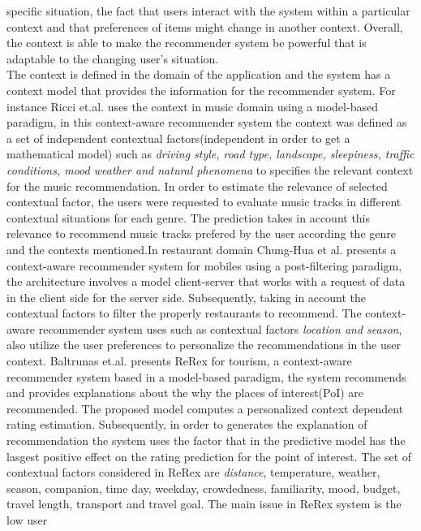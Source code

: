specific situation, the fact that users interact with the system
within a particular context and  that preferences of items might 
change in another context.  
Overall, the context is able to make the recommender system be 
powerful that is adaptable to the changing user's situation.\\
The context is defined in the domain of the application and the system
has a context model that provides the information for the recommender
system. For instance Ricci et.al. \cite{baltrunas2011incarmusic} uses
the context in music domain using a model-based paradigm, in this
context-aware recommender system the context was defined as a set of
independent contextual factors(independent in order to get a
mathematical model) such as \textit{driving style, road type,
landscape, sleepiness, traffic conditions, mood weather and natural
phenomena} to specifies the relevant context for the music
recommendation. In order to estimate the relevance of selected
contextual factor, the users were requested to evaluate music tracks
in different contextual situations for each genre. The prediction
takes in account this relevance to recommend music tracks prefered by
the user according the genre and the contexts mentioned.In
restaurant domain Chung-Hua et al.\cite{chu2013chinese} presents a
context-aware recommender system for mobiles using a post-filtering
paradigm, the architecture involves a model client-server that works
with a request of data in the client side for the server side.
Subsequently, taking in account the contextual factors to filter the
properly restaurants to recommend. The context-aware recommender
system uses such as contextual factors \textit{location and season}, 
also utilize the user preferences to personalize the recommendations
in the user context.
Baltrunas et.al.\cite{baltrunas2011context} presents ReRex for tourism, 
a context-aware recommender system based in a model-based paradigm, the system
recommends and provides explanations about the why the places of
interest(PoI) are recommended. The proposed model computes a
personalized context dependent rating estimation. Subsequently, in
order to generates the explanation of recommendation the system uses
the factor that in the predictive model has the lasgest positive
effect on the rating prediction for the point of interest. The set of
contextual factors considered in ReRex are \textit{distance},
temperature, weather, season, companion, time day, weekday,
crowdedness, familiarity, mood, budget, travel length, transport and
travel goal. The main issue in ReRex system is the low user
